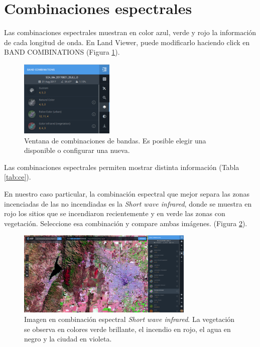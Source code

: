 \documentclass[a4paper,12pt]{book}
\begin{document}
\section{Combinaciones espectrales}

Las combinaciones espectrales muestran en color azul, verde y rojo la información de cada longitud de onda. En Land Viewer, puede modificarlo haciendo click en BAND COMBINATIONS (Figura \ref{fig:bandas}).

\begin{figure}[h!]
    \centering
    \includegraphics[width=0.4\textwidth]{fig:bandas.png}
    \caption{Ventana de combinaciones de bandas. Es posible elegir una disponible o configurar una nueva.}
    \label{fig:bandas}
\end{figure}

Las combinaciones espectrales permiten mostrar distinta información (Tabla \ref{tab:ce}).

En nuestro caso particular, la combinación espectral que mejor separa las zonas incenciadas de las no incendiadas es la \emph{Short wave infrared}, donde se muestra en rojo los sitios que se incendiaron recientemente y en verde las zonas con vegetación. Seleccione esa combinación y compare ambas imágenes. (Figura \ref{fig:incendio}).

\begin{figure}[h!]
    \centering
    \includegraphics[width=0.75\textwidth]{fig:incendio.png}
    \caption{Imagen en combinación espectral \emph{Short wave infrared}. La vegetación se observa en colores verde brillante, el incendio en rojo, el agua en negro y la ciudad en violeta.}
    \label{fig:incendio}
\end{figure}
\end{document}
